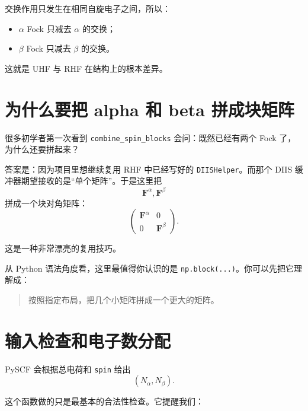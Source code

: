 \documentclass[UTF8,11pt,fontset=fandol]{ctexbook}
\begin{document}
交换作用只发生在相同自旋电子之间，所以：
\begin{itemize}
  \item $\alpha$ Fock 只减去 $\alpha$ 的交换；
  \item $\beta$ Fock 只减去 $\beta$ 的交换。
\end{itemize}

这就是 UHF 与 RHF 在结构上的根本差异。

\section{为什么要把 alpha 和 beta 拼成块矩阵}



很多初学者第一次看到 \texttt{combine\_spin\_blocks} 会问：既然已经有两个 Fock 了，为什么还要拼起来？

答案是：因为项目里想继续复用 RHF 中已经写好的 \texttt{DIISHelper}。而那个 DIIS 缓冲器期望接收的是“单个矩阵”。于是这里把
\begin{equation}
\mathbf{F}^{\alpha},\mathbf{F}^{\beta}
\end{equation}
拼成一个块对角矩阵：
\begin{equation}
\begin{pmatrix}
\mathbf{F}^{\alpha} & 0 \\
0 & \mathbf{F}^{\beta}
\end{pmatrix}.
\end{equation}

这是一种非常漂亮的复用技巧。

从 Python 语法角度看，这里最值得你认识的是 \texttt{np.block(...)}。你可以先把它理解成：

\begin{quote}
按照指定布局，把几个小矩阵拼成一个更大的矩阵。
\end{quote}

\section{输入检查和电子数分配}



PySCF 会根据总电荷和 \texttt{spin} 给出
\begin{equation}
(N_{\alpha},N_{\beta}).
\end{equation}

这个函数做的只是最基本的合法性检查。它提醒我们：
\end{document}
